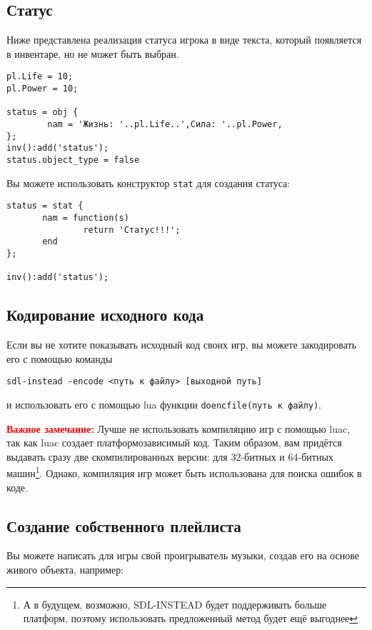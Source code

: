 \documentclass[a4paper,12pt]{article}
\begin{document}
\subsection{Статус}
Ниже представлена реализация статуса игрока в виде текста, который появляется в инвентаре, но не может быть выбран.

\begin{verbatim}
pl.Life = 10;
pl.Power = 10;

status = obj {
        nam = 'Жизнь: '..pl.Life..',Сила: '..pl.Power,
};
inv():add('status');
status.object_type = false
\end{verbatim}

Вы можете использовать конструктор \verb/stat/ для создания статуса:

\begin{verbatim}
status = stat {
       nam = function(s)
               return 'Статус!!!';
       end
};

inv():add('status');
\end{verbatim}
      
\subsection{Кодирование исходного кода}

Если вы не хотите показывать исходный код своих игр, вы можете закодировать его с помощью команды

\begin{verbatim}
sdl-instead -encode <путь к файлу> [выходной путь]
\end{verbatim}

и использовать его с помощью lua функции \verb/doencfile(путь к файлу)/.

\textbf{\textcolor{red}{Важное замечание:}} Лучше не использовать компиляцию игр с помощью luac, так как luac создает платформозависимый код. Таким образом, вам придётся выдавать сразу две скомпилированных версии: для 32-битных и 64-битных машин\footnote{А в будущем, возможно, SDL-INSTEAD будет поддерживать больше платформ, поэтому использовать предложенный метод будет ещё выгоднее}. Однако, компиляция игр может быть использована для поиска ошибок в коде.

\subsection{Создание собственного плейлиста}
Вы можете написать для игры свой проигрыватель музыки, создав его на основе живого объекта, например:
\end{document}
